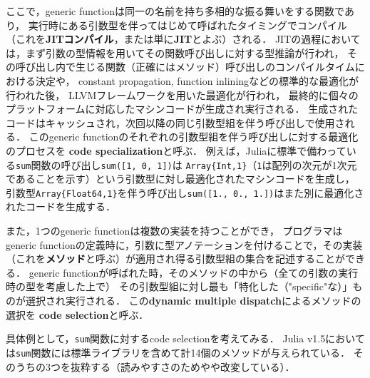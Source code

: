 ここで，generic functionは同一の名前を持ち多相的な振る舞いをする関数であり，
実行時にある引数型を伴ってはじめて呼ばれたタイミングでコンパイル
（これを\textbf{JITコンパイル}，または単に\textbf{JIT}とよぶ）される．
JITの過程においては，まず引数の型情報を用いてその関数呼び出しに対する型推論が行われ，
その呼び出し内で生じる関数（正確にはメソッド）呼び出しのコンパイルタイムにおける決定や，
constant propagation, function inliningなどの標準的な最適化が行われた後，
LLVMフレームワーク\cite{LLVM}を用いた最適化が行われ，
最終的に個々のプラットフォームに対応したマシンコードが生成され実行される．
生成されたコードはキャッシュされ，次回以降の同じ引数型組を伴う呼び出しで使用される．
このgeneric functionのそれぞれの引数型組を伴う呼び出しに対する最適化のプロセスを
\textbf{code specialization}と呼ぶ．
例えば，Juliaに標準で備わっている\verb|sum|関数の呼び出し\verb|sum([1, 0, 1])|は
\verb|Array{Int,1}|（\verb|1|は配列の次元が1次元であることを示す）という引数型に対し最適化されたマシンコードを生成し，
引数型\verb|Array{Float64,1}|を伴う呼び出し\verb|sum([1., 0., 1.])|はまた別に最適化されたコードを生成する．


また，1つのgeneric functionは複数の実装を持つことができ，
プログラマはgeneric functionの定義時に，引数に型アノテーションを付けることで，その実装
（これを\textbf{メソッド}と呼ぶ）が適用され得る引数型組の集合を記述することができる．
generic functionが呼ばれた時，そのメソッドの中から（全ての引数の実行時の型を考慮した上で）
その引数型組に対し最も「特化した（"specific"\footnotemark な）」ものが選択され実行される．
この\textbf{dynamic multiple dispatch}によるメソッドの選択を
\textbf{code selection}と呼ぶ．


具体例として，\verb|sum|関数に対するcode selectionを考えてみる．
Julia v1.5においては\verb|sum|関数には標準ライブラリを含めて計14個のメソッドが与えられている．
そのうちの3つを抜粋する（読みやすさのためやや改変している）．

